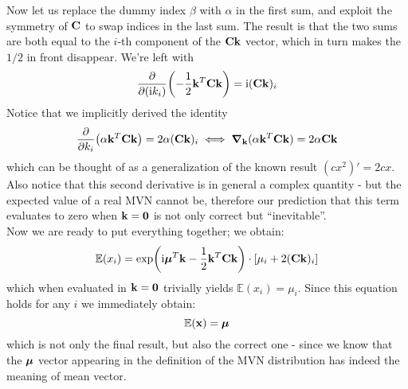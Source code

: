\documentclass[a4paper]{article}
\newcommand{\mat}[1]{\vb{#1}}
\renewcommand{\i}{\mathrm{i}} %
\begin{document}
Now let us replace the dummy index $\beta$ with $\alpha$ in the first sum, and exploit the symmetry of $\mat{C}$ to swap indices in the last sum. The result is that the two sums are both equal to the $i$-th component of the $\mat{C}\vb{k}$ vector, which in turn makes the $1/2$ in front disappear.
We're left with
\begin{equation*}
    \pdv{(\i k_i)}(-\frac{1}{2}\vb{k}^T\mat{C}\vb{k}) = \i (\mat{C}\vb{k})_i
\end{equation*}
Notice that we implicitly derived the identity
\begin{equation*}
    \pdv{k_i}(\alpha\vb{k}^T\mat{C}\vb{k})=2\alpha(\mat{C}\vb{k})_i \iff \grad_{\vb{k}}(\alpha\vb{k}^T\mat{C}\vb{k}) = 2\alpha\mat{C}\vb{k}
\end{equation*}
which can be thought of as a generalization of the known result $(cx^2)'=2cx$.\\
Also notice that this second derivative is in general a complex quantity - but the expected value of a real MVN cannot be, therefore our prediction that this term evaluates to zero when $\vb{k}=\vb{0}$ is not only correct but ``inevitable''.\\
Now we are ready to put everything together; we obtain:
\begin{equation*}
    \mathbb{E}(x_i) = \exp(\i\vb*{\mu}^T\vb{k}-\frac{1}{2}\vb{k}^T\mat{C}\vb{k})\cdot\left[\mu_i+2(\mat{C}\vb{k})_i\right]
\end{equation*}
which when evaluated in $\vb{k}=\vb{0}$ trivially yields $\mathbb{E}(x_i) = \mu_i$. Since this equation holds for any $i$ we immediately obtain:
\begin{equation*}
    \mathbb{E}(\vb{x}) = \vb*{\mu}
\end{equation*}
which is not only the final result, but also the correct one - since we know that the $\vb*{\mu}$ vector appearing in the definition of the MVN distribution has indeed the meaning of mean vector.
\end{document}
